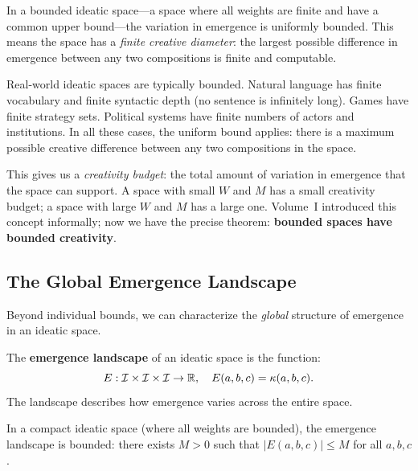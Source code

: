 \begin{interpretation}
In a bounded ideatic space---a space where all weights are finite and have a
common upper bound---the variation in emergence is uniformly bounded. This
means the space has a \emph{finite creative diameter}: the largest possible
difference in emergence between any two compositions is finite and computable.

Real-world ideatic spaces are typically bounded. Natural language has finite
vocabulary and finite syntactic depth (no sentence is infinitely long). Games
have finite strategy sets. Political systems have finite numbers of actors
and institutions. In all these cases, the uniform bound applies: there is a
maximum possible creative difference between any two compositions in the space.

This gives us a \emph{creativity budget}: the total amount of variation in
emergence that the space can support. A space with small $W$ and $M$ has a
small creativity budget; a space with large $W$ and $M$ has a large one.
Volume~I introduced this concept informally; now we have the precise theorem:
\textbf{bounded spaces have bounded creativity}.
\end{interpretation}

\subsection{The Global Emergence Landscape}

Beyond individual bounds, we can characterize the \emph{global} structure of
emergence in an ideatic space.

\begin{definition}
\label{def:emergence-landscape}
The \textbf{emergence landscape} of an ideatic space is the function:
\[
  E : \mathcal{I} \times \mathcal{I} \times \mathcal{I} \to \mathbb{R}, \quad E(a, b, c) = \kappa(a, b, c).
\]
The landscape describes how emergence varies across the entire space.
\end{definition}

\begin{theorem}
\label{thm:landscape-bounded}
In a compact ideatic space (where all weights are bounded), the emergence
landscape is bounded: there exists $M > 0$ such that $|E(a,b,c)| \leq M$ for
all $a, b, c$.
\end{theorem}

